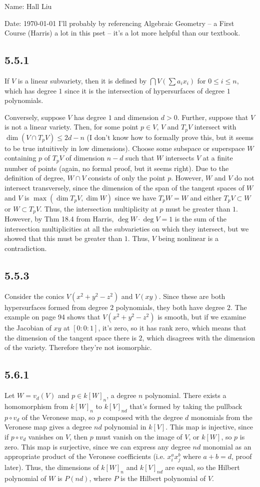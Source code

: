 \documentclass{article}
\begin{document}
Name: Hall Liu

Date: \today 
\vspace{1.5cm}
I'll probably by referencing Algebraic Geometry -- a First Course (Harris) a lot in this pset -- it's a lot more helpful than our textbook.
\subsection*{5.5.1}
If $V$ is a linear subvariety, then it is defined by $\bigcap V(\sum a_ix_i)$ for $0\leq i\leq n$, which has degree $1$ since it is the intersection of hypersurfaces of degree $1$ polynomials.

Conversely, suppose $V$ has degree $1$ and dimension $d>0$. Further, suppose that $V$ is not a linear variety. Then, for some point $p\in V$, $V$ and $T_pV$ intersect with $\dim(V\cap T_pV)\leq 2d-n$ (I don't know how to formally prove this, but it seems to be true intuitively in low dimensions). Choose some subspace or superspace $W$ containing $p$ of $T_pV$ of dimension $n-d$ such that $W$ intersects $V$ at a finite number of points (again, no formal proof, but it seems right). Due to the definition of degree, $W\cap V$ consists of only the point $p$. However, $W$ and $V$ do not intersect transversely, since the dimension of the span of the tangent spaces of $W$ and $V$ is $\max(\dim T_pV, \dim W)$ since we have $T_pW=W$ and either $T_pV\subset W$ or $W\subset T_pV$. Thus, the intersection multiplicity at $p$ must be greater than $1$. However, by Thm 18.4 from Harris, $\deg W\cdot\deg V=1$ is the sum of the intersection multiplicities at all the subvarieties on which they intersect, but we showed that this must be greater than $1$. Thus, $V$ being nonlinear is a contradiction.
\subsection*{5.5.3}
Consider the conics $V(x^2+y^2-z^2)$ and $V(xy)$. Since these are both hypersurfaces formed from degree $2$ polynomials, they both have degree $2$. The example on page 94 shows that $V(x^2+y^2-z^2)$ is smooth, but if we examine the Jacobian of $xy$ at $[0:0:1]$, it's zero, so it has rank zero, which means that the dimension of the tangent space there is $2$, which disagrees with the dimension of the variety. Therefore they're not isomorphic.
\subsection*{5.6.1}
Let $W=v_d(V)$ and $p\in k[W]_n$, a degree $n$ polynomial. There exists a homomorphism from $k[W]_n$ to $k[V]_{nd}$ that's formed by taking the pullback $p\circ v_d$ of the Veronese map, so $p$ composed with the degree $d$ monomials from the Veronese map gives a degree $nd$ polynomial in $k[V]$. This map is injective, since if $p\circ v_d$ vanishes on $V$, then $p$ must vanish on the image of $V$, or $k[W]$, so $p$ is zero. This map is surjective, since we can express any degree $nd$ monomial as an appropriate product of the Veronese coefficients (i.e. $x_i^ax_j^b$ where $a+b=d$, proof later). Thus, the dimensions of $k[W]_n$ and $k[V]_{nd}$ are equal, so the Hilbert polynomial of $W$ is $P(nd)$, where $P$ is the Hilbert polynomial of $V$.
\end{document}
